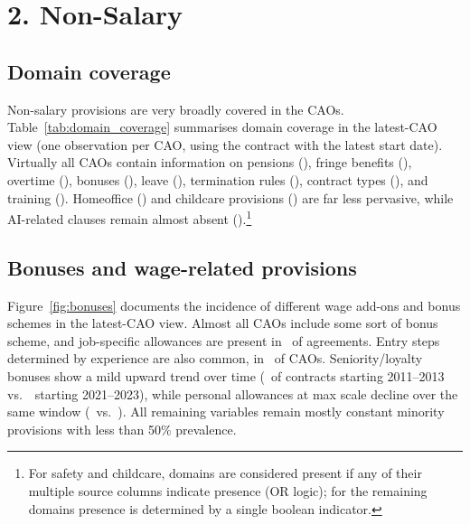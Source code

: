 \section*{2. Non-Salary}
\label{sec:non_salary}

\subsection*{Domain coverage}

Non-salary provisions are very broadly covered in the CAOs. Table~\ref{tab:domain_coverage} summarises domain coverage in the latest-CAO view (one observation per CAO, using the contract with the latest start date). Virtually all CAOs contain information on pensions (\NonSalPensionShare), fringe benefits (\NonSalFringeShare), overtime (\NonSalOvertimeShare), bonuses (\NonSalBonusShare), leave (\NonSalLeaveShare), termination rules (\NonSalTerminationShare), contract types (\NonSalContractShare), and training (\NonSalTrainingShare). Homeoffice (\NonSalHomeofficeShare) and childcare provisions (\NonSalChildcareShare) are far less pervasive, while AI-related clauses remain almost absent (\NonSalAiShare).\footnote{For safety and childcare, domains are considered present if any of their multiple source columns indicate presence (OR logic); for the remaining domains presence is determined by a single boolean indicator.}

\begin{table}[H]
    \centering
    \caption{Domain coverage in latest CAO view}
    \label{tab:domain_coverage}
    
\end{table}

\subsection*{Bonuses and wage-related provisions}

Figure~\ref{fig:bonuses} documents the incidence of different wage add-ons and bonus schemes in the latest-CAO view. Almost all CAOs include some sort of bonus scheme, and job-specific allowances are present in \NonSalJobAllowShare\ of agreements. Entry steps determined by experience are also common, in \NonSalEntryStepShare\ of CAOs. Seniority/loyalty bonuses show a mild upward trend over time (\NonSalSeniorityBonusEarly\ of contracts starting 2011--2013 vs.\ \NonSalSeniorityBonusLate\ starting 2021--2023), while personal allowances at max scale decline over the same window (\NonSalPersAllowMaxEarly\ vs.\ \NonSalPersAllowMaxLate). All remaining variables remain mostly constant minority provisions with less than 50\% prevalence.

